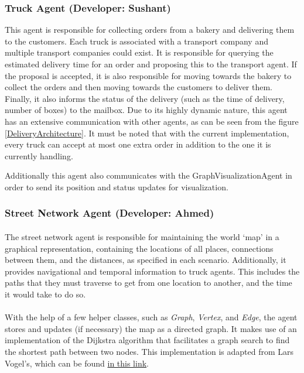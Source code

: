 \documentclass[11pt, a4paper]{article}
\begin{document}
\subsubsection{Truck Agent (Developer: Sushant)}
This agent is responsible for collecting orders from a bakery and delivering them to the customers. Each truck is associated with a transport company and multiple transport companies could exist. It is responsible for querying the estimated delivery time for an order and proposing this to the transport agent. If the proposal is accepted, it is also responsible for moving towards the bakery to collect the orders and then moving towards the customers to deliver them. Finally, it also informs the status of the delivery (such as the time of delivery, number of boxes) to the mailbox. Due to its highly dynamic nature, this agent has an extensive communication with other agents, as can be seen from the figure \ref{DeliveryArchitecture}. It must be noted that with the current implementation, every truck can accept at most one extra order in addition to the one it is currently handling. 
	
Additionally this agent also communicates with the GraphVisualizationAgent in order to send its position and status updates for visualization. 
\subsubsection{Street Network Agent (Developer: Ahmed)}
\paragraph{}
The street network agent is responsible for maintaining the world `map' in a graphical representation, containing the locations of all places, connections between them, and the distances, as specified in each scenario. Additionally, it provides navigational and temporal information to truck agents. This includes the paths that they must traverse to get from one location to another, and the time it would take to do so.
\paragraph{}
With the help of a few helper classes, such as \textit{Graph}, \textit{Vertex}, and \textit{Edge}, the agent stores and updates (if necessary) the map as a directed graph. It makes use of an implementation of the Dijkstra algorithm that facilitates a graph search to find the shortest path between two nodes. This implementation is adapted from Lars Vogel's, which can be found \href{http://www.vogella.com/tutorials/JavaAlgorithmsDijkstra/article.html}{in this link}.
\end{document}
